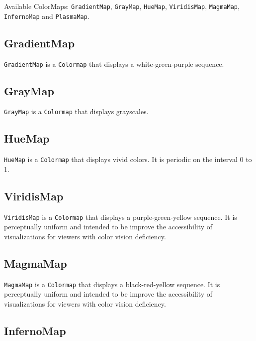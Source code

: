Available ColorMaps: \texttt{GradientMap}, \texttt{GrayMap},
\texttt{HueMap}, \texttt{ViridisMap}, \texttt{MagmaMap},
\texttt{InfernoMap} and \texttt{PlasmaMap}.

\hypertarget{gradientmap}{%
\subsection{GradientMap}\label{gradientmap}}

\texttt{GradientMap} is a \texttt{Colormap} that displays a
white-green-purple sequence.

\hypertarget{graymap}{%
\subsection{GrayMap}\label{graymap}}

\texttt{GrayMap} is a \texttt{Colormap} that displays grayscales.

\hypertarget{huemap}{%
\subsection{HueMap}\label{huemap}}

\texttt{HueMap} is a \texttt{Colormap} that displays vivid colors. It is
periodic on the interval 0 to 1.

\hypertarget{viridismap}{%
\subsection{ViridisMap}\label{viridismap}}

\texttt{ViridisMap} is a \texttt{Colormap} that displays a
purple-green-yellow sequence. It is perceptually uniform and intended to
be improve the accessibility of visualizations for viewers with color
vision deficiency.

\hypertarget{magmamap}{%
\subsection{MagmaMap}\label{magmamap}}

\texttt{MagmaMap} is a \texttt{Colormap} that displays a
black-red-yellow sequence. It is perceptually uniform and intended to be
improve the accessibility of visualizations for viewers with color
vision deficiency.

\hypertarget{infernomap}{%
\subsection{InfernoMap}\label{infernomap}}

